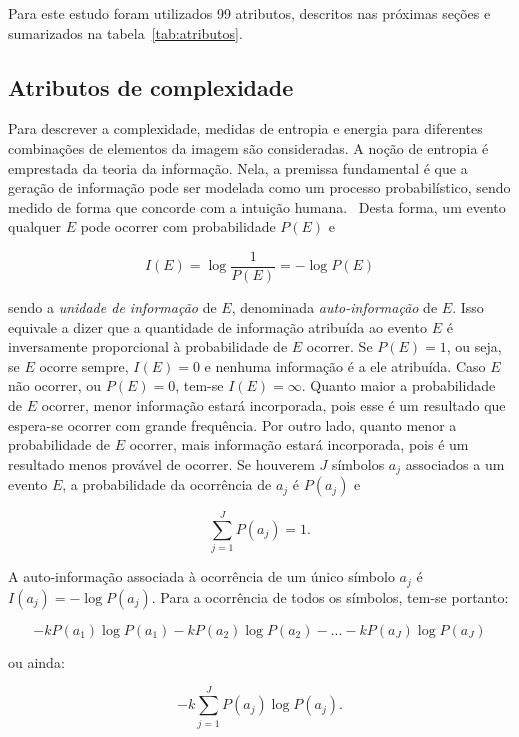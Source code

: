 Para este estudo foram utilizados 99 atributos, descritos nas próximas
seções e sumarizados na tabela~\ref{tab:atributos}.

\subsection{Atributos de complexidade}

Para descrever a complexidade, medidas de entropia e energia para
diferentes combinações de elementos da imagem são consideradas. A
noção de entropia é emprestada da teoria da informação. Nela, a
premissa fundamental é que a geração de informação pode ser modelada
como um processo probabilístico, sendo medido de forma que concorde
com a intuição humana.~\cite{gonzalez} Desta forma, um evento qualquer
$E$ pode ocorrer com probabilidade $P(E)$ e

\begin{equation}
  I(E) = \log\frac{1}{P(E)} = -\log P(E)
\end{equation}

\noindent sendo a \emph{unidade de informação} de $E$, denominada
\emph{auto-informação} de $E$. Isso equivale a dizer que a quantidade
de informação atribuída ao evento $E$ é inversamente proporcional à
probabilidade de $E$ ocorrer. Se $P(E) = 1$, ou seja, se $E$ ocorre
sempre, $I(E) = 0$ e nenhuma informação é a ele atribuída. Caso $E$
não ocorrer, ou $P(E) = 0$, tem-se $I(E) = \infty$. Quanto maior a
probabilidade de $E$ ocorrer, menor informação estará incorporada,
pois esse é um resultado que espera-se ocorrer com grande
frequência. Por outro lado, quanto menor a probabilidade de $E$
ocorrer, mais informação estará incorporada, pois é um resultado menos
provável de ocorrer. Se houverem $J$ símbolos $a_j$ associados a um
evento $E$, a probabilidade da ocorrência de $a_j$ é $P(a_j)$ e

\begin{equation}
  \sum_{j=1}^J P(a_j) = 1.
\end{equation}

\noindent A auto-informação associada à ocorrência de um único símbolo
$a_j$ é $I(a_j) = -\log P(a_j)$. Para a ocorrência de todos os
símbolos, tem-se portanto:

\begin{equation}
  -kP(a_1) \log P(a_1) -kP(a_2) \log P(a_2) -...-kP(a_J) \log P(a_J)
\end{equation}

\noindent ou ainda:

\begin{equation}
  -k \sum_{j=1}^J P(a_j) \log P(a_j).
\end{equation}

